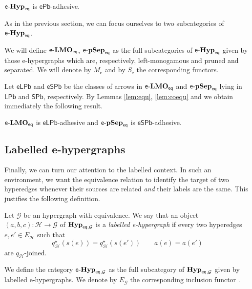 \documentclass[3p]{elsarticle}
\newcommand{\pbe}{\mathsf{ePb}}
\newcommand{\pbl}{\mathsf{LPb}}
\newcommand{\pbs}{\mathsf{SPb}}
\newcommand{\epbl}{\mathsf{eLPb}}
\newcommand{\epbs}{\mathsf{eSPb}}
\newcommand{\eq}{\mathsf{eq}}
\newcommand{\catname}[1]{\textbf{\textup{#1}}}
\newcommand{\EqHyps}{\catname{Hyp}_{\mathsf{eq}, \mathcal{G}}}
\newcommand{\egg}{\mathsf{e}\text{-}\catname{Hyp}_\eq}
\newcommand{\eggl}{\mathsf{e}\text{-}\catname{Hyp}_{\eq, \mathcal{G}}}
\newcommand{\elm}{\mathsf{e}\text{-}\catname{LMO}_\eq}
\newcommand{\eps}{\mathsf{e}\text{-}\catname{pSep}_\eq}
\theoremstyle{remark}
\theoremstyle{definition}
\begin{document}
\begin{cor}\label{cor:pbe}
	$\egg$ is $\pbe$-adhesive.
\end{cor}

As in the previous section, we can focus ourselves to two subcategories of $\egg$.

\begin{defi}We will define $\elm$, $\eps$ as the full subcategories of $\egg$ given by those e-hypergraphs which are, respectively, left-monogamous and pruned and separated. We will denote by $M_{\mathsf{e}}$ and by $S_{\mathsf{e}}$ the corresponding functors.
\end{defi}

Let $\epbl$ and $\epbs$ be the classes of arrows in  $\elm$ and $\eps$ lying in $\pbl$ and $\pbs$, respectively. By Lemmas \ref{lem:equ}, \ref{lem:coequ} and  we obtain immediately the following result.

\begin{cor}
	$\elm$ is $\epbl$-adhesive and $\eps$ is $\epbs$-adhesive.
\end{cor}


\subsection{Labelled e-hypergraphs}\label{sec:sepegg}

Finally, we can turn our attention to the labelled context. In such an environment, we want the equivalence relation to identify the target of two hyperedges whenever their sources are related \emph{and} their labels are the same. This justifies the following definition.

\begin{defi} Let $\mathcal{G}$ be an hypergraph with equivalence. We say that an object $(a,b,c)\colon \mathcal{H}\to \mathcal{G}$ of $\EqHyps$ is a \emph{labelled e-hypergraph} if every two hyperedges $e,e'\in E_{\mathcal{H}}$ such that
	\[q^\star_{\mathcal{H}}(s(e))=q^\star_{\mathcal{H}}(s(e')) \qquad a(e) = a(e')\]
	are $q_\mathcal{H}$-joined.
	
 We define the category $\eggl$ as the full subcategory of $\EqHyps$ given by labelled e-hypergraphs. We denote by $E_\mathcal{G}$ the corresponding inclusion functor .
\end{defi}
\end{document}
